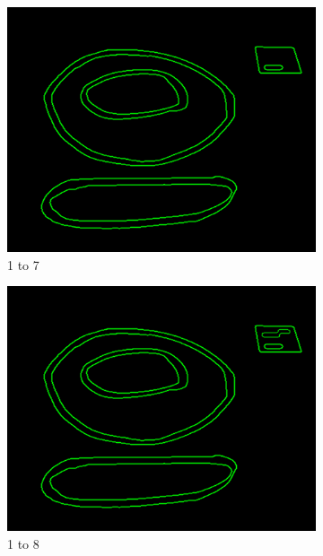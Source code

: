 \documentclass[11pt]{article}
\begin{document}
\begin{figure}
	
	\begin{subfigure}[t]{0.32\textwidth}
	\centering
		\includegraphics[scale=0.28]{pics/elimination/joinedAfterRemoval7.png}
		\caption{1 to 7}
		\label{construction7}
	\end{subfigure}
	\begin{subfigure}[t]{0.32\textwidth}
	\centering
		\includegraphics[scale=0.28]{pics/elimination/joinedAfterRemoval8.png}
		\caption{1 to 8}
		\label{construction8}
	\end{subfigure}
	\begin{subfigure}[t]{0.32\textwidth}
	\centering

\end{subfigure}
\end{figure}
\end{document}
